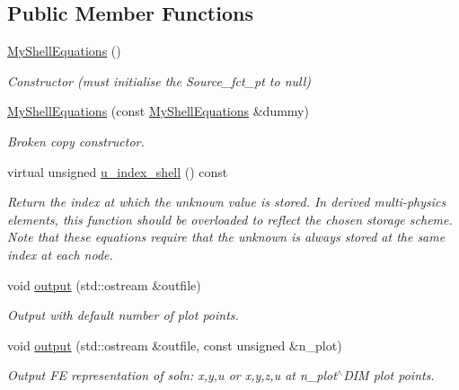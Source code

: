 \subsection*{Public Member Functions}
\begin{DoxyCompactItemize}
\item 
\hyperlink{classoomph_1_1MyShellEquations_a4d459716fb0b2b66ece7d87c0feac9ed}{My\+Shell\+Equations} ()
\begin{DoxyCompactList}\small\item\em Constructor (must initialise the Source\+\_\+fct\+\_\+pt to null) \end{DoxyCompactList}\item 
\hyperlink{classoomph_1_1MyShellEquations_af92d9d503350b3c84d309b1e70911e27}{My\+Shell\+Equations} (const \hyperlink{classoomph_1_1MyShellEquations}{My\+Shell\+Equations} \&dummy)
\begin{DoxyCompactList}\small\item\em Broken copy constructor. \end{DoxyCompactList}\item 
virtual unsigned \hyperlink{classoomph_1_1MyShellEquations_a983c9be2c162eccec2f41c391722f0aa}{u\+\_\+index\+\_\+shell} () const
\begin{DoxyCompactList}\small\item\em Return the index at which the unknown value is stored. In derived multi-\/physics elements, this function should be overloaded to reflect the chosen storage scheme. Note that these equations require that the unknown is always stored at the same index at each node. \end{DoxyCompactList}\item 
void \hyperlink{classoomph_1_1MyShellEquations_aa5434267aa4c3a6f0b86d9afbb18f0a5}{output} (std\+::ostream \&outfile)
\begin{DoxyCompactList}\small\item\em Output with default number of plot points. \end{DoxyCompactList}\item 
void \hyperlink{classoomph_1_1MyShellEquations_ad4ad93d1ef0640f5ded693e0bc46aeb6}{output} (std\+::ostream \&outfile, const unsigned \&n\+\_\+plot)
\begin{DoxyCompactList}\small\item\em Output FE representation of soln\+: x,y,u or x,y,z,u at n\+\_\+plot$^\wedge$\+D\+IM plot points. \end{DoxyCompactList}\item 

\end{DoxyCompactItemize}
